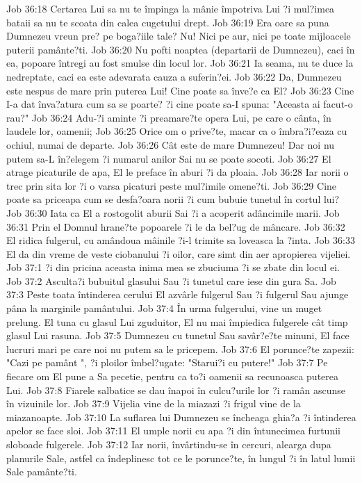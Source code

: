 Job 36:18  Certarea Lui sa nu te împinga la mânie împotriva Lui ?i mul?imea bataii sa nu te scoata din calea cugetului drept.
Job 36:19  Era oare sa puna Dumnezeu vreun pre? pe boga?iile tale? Nu! Nici pe aur, nici pe toate mijloacele puterii pamânte?ti.
Job 36:20  Nu pofti noaptea (departarii de Dumnezeu), caci în ea, popoare întregi au fost smulse din locul lor.
Job 36:21  Ia seama, nu te duce la nedreptate, caci ea este adevarata cauza a suferin?ei.
Job 36:22  Da, Dumnezeu este nespus de mare prin puterea Lui! Cine poate sa înve?e ca El?
Job 36:23  Cine I-a dat înva?atura cum sa se poarte? ?i cine poate sa-I spuna: "Aceasta ai facut-o rau?"
Job 36:24  Adu-?i aminte ?i preamare?te opera Lui, pe care o cânta, în laudele lor, oamenii;
Job 36:25  Orice om o prive?te, macar ca o îmbra?i?eaza cu ochiul, numai de departe.
Job 36:26  Cât este de mare Dumnezeu! Dar noi nu putem sa-L în?elegem ?i numarul anilor Sai nu se poate socoti.
Job 36:27  El atrage picaturile de apa, El le preface în aburi ?i da ploaia.
Job 36:28  Iar norii o trec prin sita lor ?i o varsa picaturi peste mul?imile omene?ti.
Job 36:29  Cine poate sa priceapa cum se desfa?oara norii ?i cum bubuie tunetul în cortul lui?
Job 36:30  Iata ca El a rostogolit aburii Sai ?i a acoperit adâncimile marii.
Job 36:31  Prin el Domnul hrane?te popoarele ?i le da bel?ug de mâncare.
Job 36:32  El ridica fulgerul, cu amândoua mâinile ?i-l trimite sa loveasca la ?inta.
Job 36:33  El da din vreme de veste ciobanului ?i oilor, care simt din aer apropierea vijeliei.
Job 37:1  ?i din pricina aceasta inima mea se zbuciuma ?i se zbate din locul ei.
Job 37:2  Asculta?i bubuitul glasului Sau ?i tunetul care iese din gura Sa.
Job 37:3  Peste toata întinderea cerului El azvârle fulgerul Sau ?i fulgerul Sau ajunge pâna la marginile pamântului.
Job 37:4  În urma fulgerului, vine un muget prelung. El tuna cu glasul Lui zguduitor, El nu mai împiedica fulgerele cât timp glasul Lui rasuna.
Job 37:5  Dumnezeu cu tunetul Sau savâr?e?te minuni, El face lucruri mari pe care noi nu putem sa le pricepem.
Job 37:6  El porunce?te zapezii: "Cazi pe pamânt ", ?i ploilor îmbel?ugate: "Starui?i cu putere!"
Job 37:7  Pe fiecare om El pune a Sa pecetie, pentru ca to?i oamenii sa recunoasca puterea Lui.
Job 37:8  Fiarele salbatice se dau înapoi în culcu?urile lor ?i ramân ascunse în vizuinile lor.
Job 37:9  Vijelia vine de la miazazi ?i frigul vine de la miazanoapte.
Job 37:10  La suflarea lui Dumnezeu se încheaga ghia?a ?i întinderea apelor se face sloi.
Job 37:11  El umple norii cu apa ?i din întunecimea furtunii sloboade fulgerele.
Job 37:12  Iar norii, învârtindu-se în cercuri, alearga dupa planurile Sale, astfel ca îndeplinesc tot ce le porunce?te, în lungul ?i în latul lumii Sale pamânte?ti.
